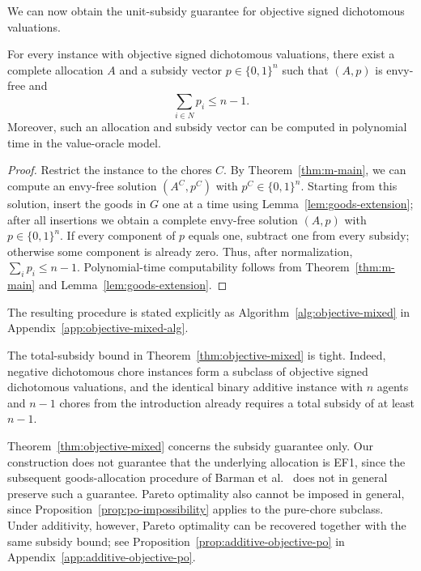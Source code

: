 We can now obtain the unit-subsidy guarantee for objective signed dichotomous valuations.

\begin{theorem}
\label{thm:objective-mixed}
For every instance with objective signed dichotomous valuations, there exist a complete allocation $A$ and a subsidy vector $p\in\{0,1\}^n$ such that $(A,p)$ is envy-free and
\[
\sum_{i\in N} p_i\leq n-1.
\]
Moreover, such an allocation and subsidy vector can be computed in polynomial time in the value-oracle model.
\end{theorem}

\begin{proof}
Restrict the instance to the chores $C$. By Theorem~\ref{thm:m-main}, we can compute an envy-free solution $(A^C,p^C)$ with $p^C\in\{0,1\}^n$. Starting from this solution, insert the goods in $G$ one at a time using Lemma~\ref{lem:goods-extension}; after all insertions we obtain a complete envy-free solution $(A,p)$ with $p\in\{0,1\}^n$. If every component of $p$ equals one, subtract one from every subsidy; otherwise some component is already zero. Thus, after normalization, $\sum_i p_i\le n-1$. Polynomial-time computability follows from Theorem~\ref{thm:m-main} and Lemma~\ref{lem:goods-extension}.
\end{proof}

The resulting procedure is stated explicitly as Algorithm~\ref{alg:objective-mixed} in Appendix~\ref{app:objective-mixed-alg}.

The total-subsidy bound in Theorem~\ref{thm:objective-mixed} is tight. Indeed, negative dichotomous chore instances form a subclass of objective signed dichotomous valuations, and the identical binary additive instance with $n$ agents and $n-1$ chores from the introduction already requires a total subsidy of at least $n-1$.

Theorem~\ref{thm:objective-mixed} concerns the subsidy guarantee only. Our construction does not guarantee that the underlying allocation is EF1, since the subsequent goods-allocation procedure of Barman et al.~\cite{BKNS22} does not in general preserve such a guarantee. Pareto optimality also cannot be imposed in general, since Proposition~\ref{prop:po-impossibility} applies to the pure-chore subclass. Under additivity, however, Pareto optimality can be recovered together with the same subsidy bound; see Proposition~\ref{prop:additive-objective-po} in Appendix~\ref{app:additive-objective-po}.
